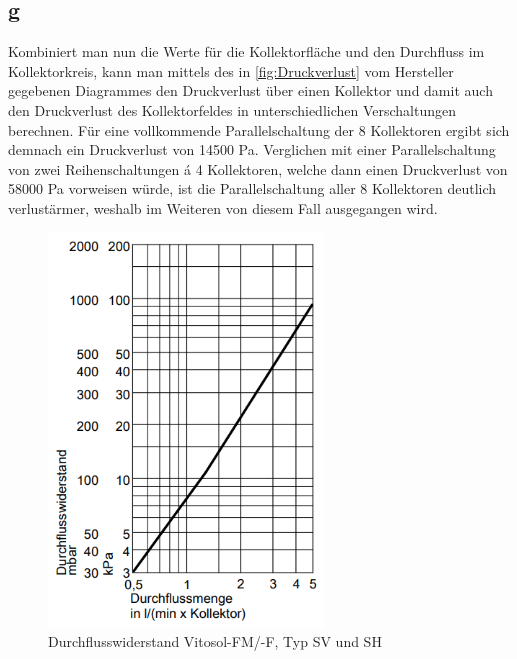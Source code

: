 \subsection{g}
Kombiniert man nun die Werte für die Kollektorfläche und den Durchfluss im Kollektorkreis, kann man
mittels des in \autoref{fig:Druckverlust} vom Hersteller gegebenen Diagrammes den Druckverlust
über einen Kollektor und damit auch
den Druckverlust des Kollektorfeldes in unterschiedlichen Verschaltungen berechnen. Für eine vollkommende
Parallelschaltung der 8 Kollektoren ergibt sich demnach ein Druckverlust von 14500 Pa.
Verglichen mit einer Parallelschaltung von zwei Reihenschaltungen á 4 Kollektoren, welche dann einen
Druckverlust von 58000 Pa vorweisen würde, ist die Parallelschaltung aller 8 Kollektoren deutlich verlustärmer, weshalb im Weiteren
von diesem Fall ausgegangen wird.
\begin{figure}[H]
    \centering
    \includegraphics[width=0.65\textwidth]{Abbildungen/Druckverlust.png}
    \caption{Durchflusswiderstand Vitosol-FM/-F, Typ SV und SH\cite[S.129]{Viessmann}}
    \label{fig:Druckverlust}  
\end{figure}

